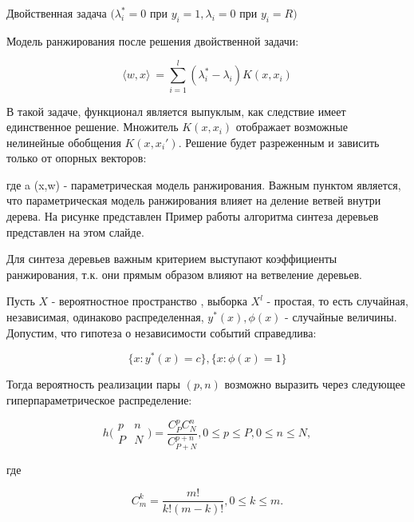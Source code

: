 \documentclass[review]{elsarticle}
\begin{document}
Двойственная задача $(\lambda^{*}_{i} = 0$ при $y_{i} = 1, \lambda_{i} = 0$ при $y_{i} = R)$


Модель ранжирования после решения двойственной задачи:

\begin{equation}
    \label{eq:rank_model1}
     \langle w, x \rangle \ = \sum_{i=1}^{l}(\lambda_{i}^{*} - \lambda_{i})K(x, x_{i}) 
\end{equation}

В такой задаче, функционал является выпуклым, как следствие имеет единственное решение. Множитель $K(x, x_{i})$ отображает возможные нелинейные обобщения $K(x, x_{i}')$. Решение будет разреженным и зависить только от опорных векторов:


где a (x,w) - параметрическая модель ранжирования.
Важным пунктом является, что параметрическая модель ранжирования влияет на деление ветвей внутри дерева. На рисунке представлен Пример работы алгоритма синтеза деревьев представлен на этом слайде.

 
Для синтеза деревьев важным критерием выступают коэффициенты ранжирования, т.к. они прямым образом влияют на ветвеление деревьев.

Пусть $X$ - вероятностное пространство , выборка $X^{l}$ - простая, то есть случайная, независимая, одинаково распределенная, $y^{*}(x), \phi(x)$ - случайные величины.
Допустим, что гипотеза о независимости событий справедлива:

\begin{equation}
    \label{eq:equation35}
    \{x: y^*(x) = c\} , \{x: \phi(x) = 1\}
\end{equation}

Тогда вероятность реализации пары $(p, n)$ возможно выразить через следующее гиперпараметрическое распределение:

\begin{equation}
    \label{eq:equation36}
     h\Bigg( 
    \begin{matrix}
    p & n \\
    P & N
    \end{matrix}
     \Bigg)
    =
    \frac{C_P^p C_N^n}{C^{p+n}_{P+N}}, 0 \leq p \leq P, 0 \leq n \leq N  ,
\end{equation}

где

\begin{equation}
    \label{eq:equation37}
    C^{k}_m = \frac{m!}{k!(m-k)!}, 0 \leq k \leq m.
\end{equation}
\end{document}
